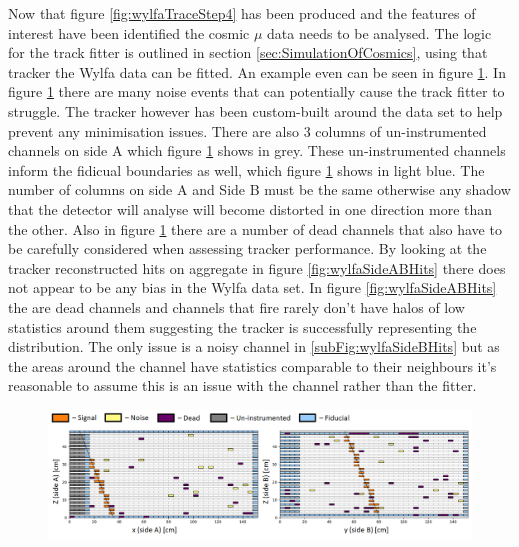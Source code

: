 Now that figure \ref{fig:wylfaTraceStep4} has been produced and the features of interest have been identified the cosmic $\mu$ data needs to be analysed. The logic for the track fitter is outlined in section \ref{sec:SimulationOfCosmics}, using that tracker the Wylfa data can be fitted. An example even can be seen in figure \ref{fig:3000ExampleEventWithKey}. In figure \ref{fig:3000ExampleEventWithKey} there are many noise events that can potentially cause the track fitter to struggle. The tracker however has been custom-built around the data set to help prevent any minimisation issues. There are also 3 columns of un-instrumented channels on side A which figure \ref{fig:3000ExampleEventWithKey} shows in grey. These un-instrumented channels inform the fidicual boundaries as well, which figure \ref{fig:3000ExampleEventWithKey} shows in light blue. The number of columns on side A and Side B must be the same otherwise any shadow that the detector will analyse will become distorted in one direction more than the other. Also in figure \ref{fig:3000ExampleEventWithKey} there are a number of dead channels that also have to be carefully considered when assessing tracker performance. By looking at the tracker reconstructed hits on aggregate in figure \ref{fig:wylfaSideABHits} there does not appear to be any bias in the Wylfa data set. In figure \ref{fig:wylfaSideABHits} the are dead channels and channels that fire rarely don't have halos of low statistics around them suggesting the tracker is successfully representing the distribution. The only issue is a noisy channel in \ref{subFig:wylfaSideBHits} but as the areas around the channel have statistics comparable to their neighbours it's reasonable to assume this is an issue with the channel rather than the fitter. 

\begin{figure}[!h]
 \centering
 \includegraphics[width=\linewidth]{Chapter5/Figs/wylfaRasterNew/3000ExampleEventWithKey.png}
 \label{fig:3000ExampleEventWithKey}
\end{figure}

